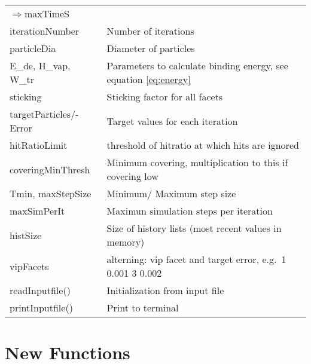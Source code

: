 \begin{center}
\begin{tabular}{|l|l|}
\enskip$\Rightarrow$maxTimeS&\\
\rule{0pt}{3ex} iterationNumber& Number of iterations\\
\rule{0pt}{3ex} particleDia& Diameter of particles\\
\rule{0pt}{3ex}  E\_de, H\_vap, W\_tr& Parameters to calculate binding energy, see equation \ref{eq:energy}\\
\rule{0pt}{3ex}  sticking&  Sticking factor for all facets\\
\rule{0pt}{3ex}  targetParticles/-Error&  Target values for each iteration\\
\rule{0pt}{3ex}  hitRatioLimit&  threshold of hitratio at which hits are ignored\\
\rule{0pt}{3ex}  coveringMinThresh&  Minimum covering, multiplication to this if covering low\\
\rule{0pt}{3ex}  Tmin, maxStepSize&  Minimum/ Maximum step size\\
\rule{0pt}{3ex}  maxSimPerIt&  Maximun simulation steps per iteration\\
\rule{0pt}{3ex}  histSize&  Size of history lists (most recent values in memory)\\
\rule{0pt}{3ex}  vipFacets&  alterning: vip facet and target error, e.g.\ 1 0.001 3 0.002\\
\hline
\rule{0pt}{3ex} readInputfile()& Initialization from input file\\
\rule{0pt}{3ex} printInputfile()& Print to terminal\\
\hline
\end{tabular}
\end{center}

\section{New Functions}
